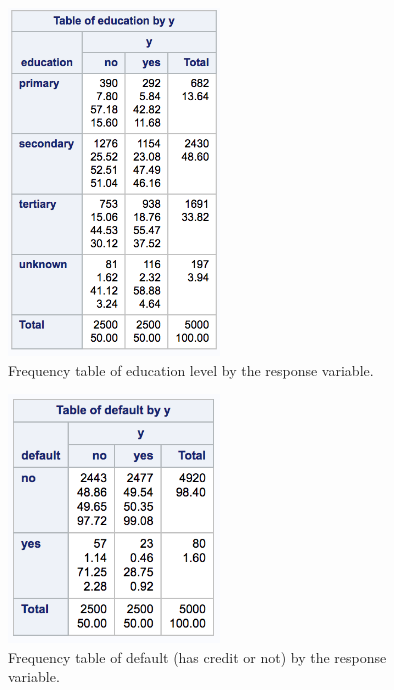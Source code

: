 \documentclass[]{article}
\begin{document}
\begin{figure}
  \centering
    \includegraphics[width=0.5\textwidth]{images/fig7_educ.png}
  \caption{Frequency table of education level by the response variable.}
  \label{fig7}
\end{figure}

\begin{figure}
  \centering
    \includegraphics[width=0.5\textwidth]{images/fig8_default.png}
  \caption{Frequency table of default (has credit or not) by the response variable.}
  \label{fig8}
\end{figure}
\end{document}
